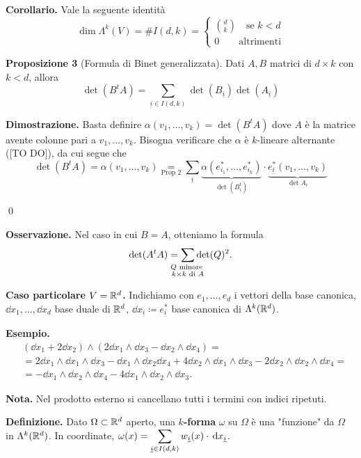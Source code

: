 \textbf{Corollario.} Vale la seguente identità 
%
$$
\dim \Lambda^k(V) = \# I(d,k) = 
\begin{cases}
	\binom{d}{k} \quad \text{se } k < d \\
	0 \qquad \text{altrimenti} 
\end{cases} 
$$
%

\textbf{Proposizione 3} (Formula di Binet generalizzata).
Dati $A,B$ matrici di $d \times k$ con $k < d$, allora
%
$$
	\det(B^tA) = \sum_{\underline{i} \in I(d,k)} \det(B_{\underline{i}}) \det (A_{\underline{i}})
$$
%

\textbf{Dimostrazione.} Basta definire $\alpha(v_1,\ldots,v_k) = \det(B^t A)$ dove $A$ è la matrice avente colonne pari a $v_1,\ldots,v_k$.
Bisogna verificare che $\alpha$ è $k$-lineare alternante ([TO DO]), da cui segue che
%
$$
	\det(B^tA) = \alpha(v_1,\ldots,v_k) 
	\underset{\text{Prop 2} }{=} \sum_{\underline{i}} \underbrace{\alpha(e_{i_1}^*,\ldots,e_{i_k}^*)}_{\det(B_{\underline{i}}^t)}
	\cdot \underbrace{e_{\underline{i}}^* (v_1,\ldots,v_k)}_{\det A_i}
$$
%

\qed

\textbf{Osservazione.} Nel caso in cui $B = A$, otteniamo la formula
%
$$
	\det(A^tA) = \sum_{\mathclap{\substack{Q \text{ minore } \\ k \times k \text{ di } A }}} \det(Q)^2.
$$
%


\textbf{Caso particolare $V = \mathbb R^d$.} Indichiamo con $e_1,\ldots,e_d$ i vettori della base canonica, $\dd x_1,\ldots, \dd x_d$ base duale di $\mathbb R^d$, $\dd x_{\underline{i}} \coloneqq e_{\underline{i}}^*$ base canonica di $\Lambda^k(\mathbb R^d)$.


\textbf{Esempio.}
\begin{align*}
	& (\dd x_1 + 2 \dd x_2) \wedge (2 \dd x_1 \wedge \dd x_3 - \dd x_2 \wedge\dd x_4) = \\
	& = 2 \dd x_1 \wedge\dd x_1 \wedge\dd x_3 - \dd x_1 \wedge\dd x_2 \dd x_4 + 4 \dd x_2 \wedge\dd x_1 \wedge\dd x_3 - 2 \dd x_2 \wedge\dd x_2 \wedge\dd x_4 = \\
	& = - \dd x_1 \wedge\dd x_2 \wedge\dd x_4 - 4 \dd x_1 \wedge\dd x_2 \wedge\dd x_3.
\end{align*}

\textbf{Nota.} Nel prodotto esterno si cancellano tutti i termini con indici ripetuti.

\textbf{Definizione.} Dato $\Omega \subset \mathbb R^d$ aperto, una \textbf{$k$-forma} $\omega$ su $\Omega$ è una "funzione"  da $\Omega$ in $\Lambda^k(\mathbb R^d)$. In coordinate, $\displaystyle \omega(x) = \sum_{\underline{i} \in I(d,k)} w_{\underline{i}}(x) \cdot \,\mathrm{d} x_{\underline{i}}$.

